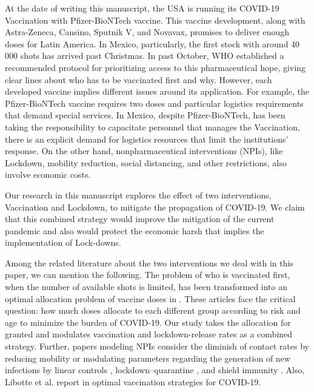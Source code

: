 
    At the date of writing this manuscript, the USA is running its COVID-19 Vaccination
with Pfizer-BioNTech vaccine. This vaccine development, along with Astra-Zeneca, 
Cansino, Sputnik V, and Novavax, promises to deliver enough doses for Latin America.
In Mexico, particularly, the first stock with around 40 000 shots has arrived past
Christmas. In past October, WHO established a recommended protocol for prioritizing
access to this pharmaceutical hope, giving clear lines about who has to be vaccinated
first and why. However, each developed vaccine implies different issues around its 
application. For example, the Pfizer-BioNTech vaccine requires two doses and particular
logistics requirements that demand special services. In Mexico, despite Pfizer-BioNTech,
has been taking the responsibility to capacitate personnel that manages the Vaccination,
there is an explicit demand for logistics resources that limit the institutions' response. 
On the other hand, nonpharmaceutical interventions (NPIs), like Lockdown, mobility reduction, 
social distancing, and other restrictions, also involve economic costs.  

    Our research in this manuscript explores the effect of two interventions, 
Vaccination and Lockdown, to mitigate the  propagation of COVID-19.
We claim that this combined strategy would improve the mitigation of the current pandemic
and also would protect the economic harsh that implies the implementation of Lock-downs.


    Among the related literature about the two interventions we deal with in this paper, 
we can mention the following. The problem of who is vaccinated first, when the number
of available shots is limited, has been transformed into an optimal allocation problem
of vaccine doses in \cite{Bubar2020,Matrajt2020,Buckner2020}.  
These articles face the critical question:  how much doses allocate to each different
group according to risk and age to minimize the burden of COVID-19. Our study takes
the allocation for granted and modulates vaccination and lockdown-release rates as
a combined strategy. Further, papers modeling NPIs consider the diminish of contact 
rates by reducing mobility or modulating parameters regarding the generation of new
infections by linear controls \cite{Naraigh2020,Ullah2020},
lockdown--quarantine \cite{Mandal2020}, and shield immunity
\cite{Weitz2020}. Also, Libotte et al. report in \cite{Libotte2020} optimal vaccination
strategies for COVID-19.  
 

